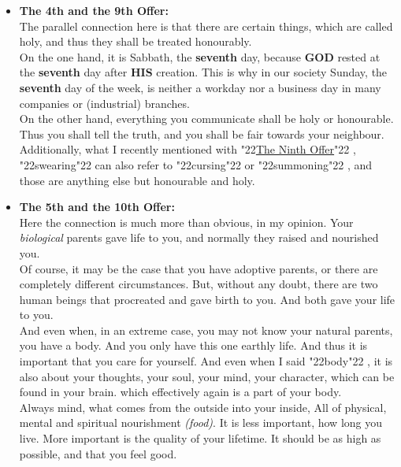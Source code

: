 \documentclass[12pt,a5paper]{article}
\newcommand{\God}[0]{\textbf{GOD}}
\newcommand{\He}[0]{\textbf{HE}}
\newcommand{\His}[0]{\textbf{HIS}}
\newcommand{\q}[1]{\char"22{#1}\char"22 }
\begin{document}
\begin{itemize}
					Let me show you a very extreme example:
					Let's say,
					you are jumping out of the window,
					and you are saying something like:
					\q{If {\God} exists, {\He} will catch me.}
					With this action you would \q{steal} of {\His} almightiness.
					\\
					And on the other hand,
					towards your fellow human being,
					it should be clear that you do not take away of him without justification,
					i.e. actual theft,
					but also you shall not claim services without justification:
					\q{theft of service},
					usually called \q{betrayal}.
			\item	\textbf{The 4th and the 9th Offer:}
					\\
					The parallel connection here is that there are certain things,
					which are called holy,
					and thus they shall be treated honourably.
					\\
					On the one hand,
					it is Sabbath,
					the \textbf{seventh} day,
					because {\God} rested at the \textbf{seventh} day after {\His} creation.
					This is why in our society Sunday,
					the \textbf{seventh} day of the week,
					is neither a workday nor a business day in many companies or (industrial) branches.
					\\
					On the other hand,
					everything you communicate shall be holy or honourable.
					Thus you shall tell the truth,
					and you shall be fair towards your neighbour.
					Additionally,
					what I recently mentioned with \q{\hyperref[TheNinthOffer]{The Ninth Offer}},
					\q{swearing} can also refer to \q{cursing} or \q{summoning},
					and those are anything else but honourable and holy.
			\item	\textbf{The 5th and the 10th Offer:}
					\\
					Here the connection is much more than obvious,
					in my opinion.
					Your \textit{biological} parents gave life to you,
					and normally they raised and nourished you.
					\\
					Of course,
					it may be the case that you have adoptive parents,
					or there are completely different circumstances.
					But,
					without any doubt,
					there are two human beings that procreated and gave birth to you.
					And both gave your life to you.
					\\
					And even when,
					in an extreme case,
					you may not know your natural parents,
					you have a body.
					And you only have this one earthly life.
					And thus it is important that you care for yourself.
					And even when I said \q{body},
					it is also about your thoughts,
					your soul,
					your mind,
					your character,
					which can be found in your brain.
					which effectively again is a part of your body.
					\\
					Always mind,
					what comes from the outside into your inside,
					All of physical,
					mental and spiritual nourishment \textit{(food)}.
					It is less important,
					how long you live.
					More important is the quality of your lifetime.
					It should be as high as possible,
					and that you feel good.
		\end{itemize}
	
\end{document}
